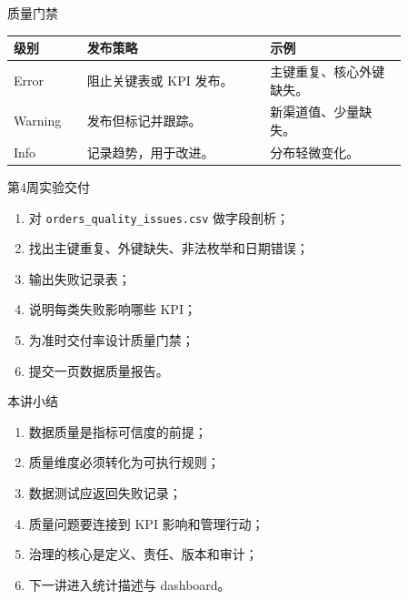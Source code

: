 \documentclass[UTF8,fontset=fandol,aspectratio=169,11pt]{ctexbeamer}
\begin{document}
\begin{frame}{质量门禁}
\begin{table}
\small
\centering
\begin{tabular}{p{0.16\linewidth}p{0.40\linewidth}p{0.30\linewidth}}
\toprule
级别 & 发布策略 & 示例\\
\midrule
Error & 阻止关键表或 KPI 发布。 & 主键重复、核心外键缺失。\\
Warning & 发布但标记并跟踪。 & 新渠道值、少量缺失。\\
Info & 记录趋势，用于改进。 & 分布轻微变化。\\
\bottomrule
\end{tabular}
\end{table}
\end{frame}

\begin{frame}{第4周实验交付}
\begin{enumerate}
  \item 对 \texttt{orders\_quality\_issues.csv} 做字段剖析；
  \item 找出主键重复、外键缺失、非法枚举和日期错误；
  \item 输出失败记录表；
  \item 说明每类失败影响哪些 KPI；
  \item 为准时交付率设计质量门禁；
  \item 提交一页数据质量报告。
\end{enumerate}
\end{frame}

\begin{frame}{本讲小结}
\begin{enumerate}
  \item 数据质量是指标可信度的前提；
  \item 质量维度必须转化为可执行规则；
  \item 数据测试应返回失败记录；
  \item 质量问题要连接到 KPI 影响和管理行动；
  \item 治理的核心是定义、责任、版本和审计；
  \item 下一讲进入统计描述与 dashboard。
\end{enumerate}
\end{frame}
\end{document}
